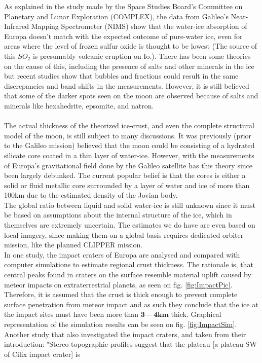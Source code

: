 As explained in the study made by the Space Studies Board's Committee on Planetary and Lunar Exploration (COMPLEX), the data from Galileo’s Near-Infrared Mapping Spectrometer (NIMS) show that the water-ice absorption of Europa doesn't match with the expected outcome of pure-water ice, even for areas where the level of frozen sulfur oxide is thought to be lowest (The source of this $SO_2$ is presumably volcanic eruption on Io.). There has been some theories on the cause of this, including the presence of salts and other minerals in the ice but recent studies show that bubbles and fractions could result in the same discrepancies and band shifts in the measurements. However, it is still believed that some of the darker spots seen on the moon are observed because of salts and minerals like hexahedrite, epsomite, and natron\cite{SciStrat}. %
\\
\\
The actual thickness of the theorized ice-crust, and even the complete structural model of the moon, is still subject to many discussions. It was previously (prior to the Galileo mission) believed that the moon could be consisting of a hydrated silicate core coated in a thin layer of water-ice. However, with the measurements of Europa's gravitational field done by the Galileo satellite has this theory since been largely debunked. The current popular belief is that the cores is either a solid or fluid metallic core surrounded by a layer of water and ice of more than 100km due to the estimated density of the Jovian body. \\
The global ratio between liquid and solid water-ice is still unknown since it must be based on assumptions about the internal structure of the ice, which in themselves are extremely uncertain. The estimates we do have are even based on local imagery, since making them on a global basis requires dedicated orbiter mission, like the planned CLIPPER mission.\\%
In one study, the impact craters of Europa are analysed and compared with computer simulations to estimate regional crust thickness. The rationale is, that central peaks found in craters on the surface resemble material uplift caused by meteor impacts on extraterrestrial planets\cite{ThickImpact}, as seen on fig. \ref{fig:ImpactPic}. Therefore, it is assumed that the crust is thick enough to prevent complete surface penetration from meteor impact and as such they conclude that the ice at the impact sites must have been more than 	$\mathbf{3-4km}$ thick. Graphical representation of the simulation results can be seen on fig. \ref{fig:ImpactSim}. Another study that also investigated the impact craters, and taken from their introduction: "Stereo topographic profiles suggest that the plateau [a plateau SW of Cilix impact crater] is
